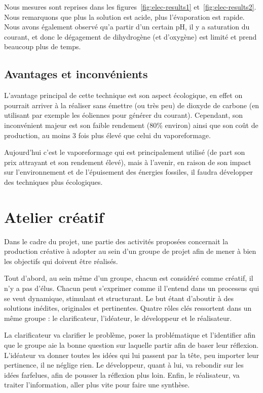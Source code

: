 Nous mesures sont reprises dans les figures~\ref{fig:elec-results1}
et~\ref{fig:elec-results2}.
Nous remarquons que plus la solution est acide, plus l'évaporation est rapide. Nous avons également observé qu'a partir d'un certain pH, il y a saturation du courant, et donc le dégagement de dihydrogène (et d'oxygène) est limité et prend beaucoup plus de temps.

\subsection{Avantages et inconvénients}
L'avantage principal de cette technique est son aspect écologique, en effet on pourrait arriver à la réaliser sans émettre (ou très peu) de dioxyde de carbone (en utilisant par exemple les éoliennes pour générer du courant). Cependant, son inconvénient majeur est son faible rendement (80\% environ) ainsi que son coût de production, au moins 3 fois plus élevé que celui du vaporeformage. \cite{wehicles-elec}

Aujourd'hui c'est le vaporeformage qui est principalement utilisé (de part son prix attrayant et son rendement élevé), mais à l'avenir, en raison de son impact sur l'environnement et de l'épuisement des énergies fossiles, il faudra développer des techniques plus écologiques. \cite{wehicles-vapo}

\section{Atelier créatif}
Dans le cadre du projet, une partie des activités proposées concernait la production créative à adopter au sein d'un groupe de projet afin de mener à bien les objectifs qui doivent être réalisés.

Tout d'abord, au sein même d'un groupe, chacun est considéré comme créatif, il n'y a pas d'élus. Chacun peut s'exprimer comme il l'entend dans un processus qui se veut dynamique, stimulant et structurant. Le but étant d'aboutir à des solutions inédites, originales et pertinentes.
Quatre rôles clés ressortent dans un même groupe : le clarificateur, l'idéateur, le développeur et le réalisateur.

La clarificateur va clarifier le problème, poser la problématique et l'identifier afin que le groupe aie la bonne question sur laquelle partir afin de baser leur réflexion. L'idéateur va donner toutes les idées qui lui passent par la tête, peu importer leur pertinence, il ne néglige rien. Le développeur, quant à lui, va rebondir sur les idées farfelues, afin de pousser la réflexion plus loin. Enfin, le réalisateur, va traiter l'information, aller plus vite pour faire une synthèse.

